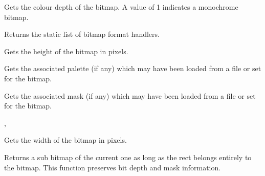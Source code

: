 

Gets the colour depth of the bitmap. A value of 1 indicates a
monochrome bitmap.



Returns the static list of bitmap format handlers.



\label{wxbitmapgetheight}


Gets the height of the bitmap in pixels.

\label{wxbitmapgetpalette}


Gets the associated palette (if any) which may have been loaded from a file
or set for the bitmap.



\label{wxbitmapgetmask}


Gets the associated mask (if any) which may have been loaded from a file
or set for the bitmap.


, 

\label{wxbitmapgetwidth}


Gets the width of the bitmap in pixels.



\label{wxbitmapgetsubbitmap}


Returns a sub bitmap of the current one as long as the rect belongs entirely to
the bitmap. This function preserves bit depth and mask information.

